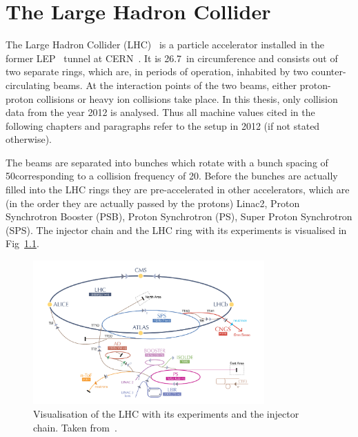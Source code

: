 \chapter{The Large Hadron Collider}

The Large Hadron Collider (LHC)~\cite{bib:LHC_machine_2008,bib:LHC_2004} is a particle accelerator installed in the former LEP~\cite{bib:LEP_design_1984} tunnel at CERN~\cite{bib:CERN:web}.
It is 26.7~\km in circumference and consists out of two separate rings, which are, in periods of operation, inhabited by two counter-circulating beams.
At the interaction points of the two beams, either proton-proton collisions or heavy ion collisions take place.
In this thesis, only collision data from the year 2012 is analysed.
Thus all machine values cited in the following chapters and paragraphs refer to the setup in 2012 (if not stated otherwise).

The beams are separated into bunches which rotate with a bunch spacing of 50\ns corresponding to a collision frequency of 20\mhz.
Before the bunches are actually filled into the LHC rings they are pre-accelerated in other accelerators, which are (in the order they are actually passed by the protons) Linac2, Proton  Synchrotron Booster (PSB), Proton Synchrotron (PS), Super Proton Synchrotron (SPS).
The injector chain and the LHC ring with its experiments is visualised in Fig~\ref{fig:LHC}.
\begin{figure}[!b]
  \centering
      \includegraphics[width=0.79\textwidth]{figures/experiment/LHC/LHC_small.png}
  \caption{Visualisation of the LHC with its experiments and the injector chain. Taken from~\cite{bib:CERNBrochure}.}  
  \label{fig:LHC}
\end{figure}

